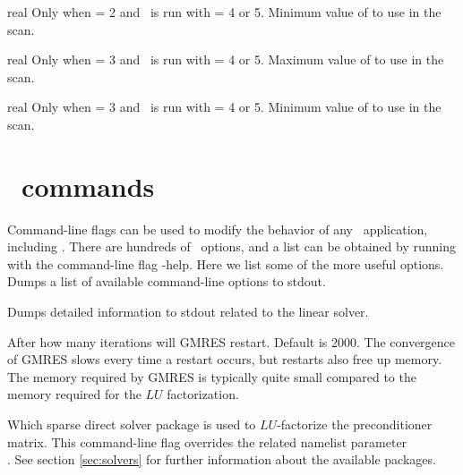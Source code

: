 \myhrule

{real}
{Only when  = 2 and \sfincsScan~is run with  = 4 or 5.}
{Minimum value of  to use in the scan.}

\myhrule

{real}
{Only when  = 3 and \sfincsScan~is run with  = 4 or 5.}
{Maximum value of  to use in the scan.}

\myhrule

{real}
{Only when  = 3 and \sfincsScan~is run with  = 4 or 5.}
{Minimum value of  to use in the scan.}


\section{\PETSc~commands}

Command-line flags can be used to modify the behavior of any \PETSc~application, including \sfincs.
There are hundreds of \PETSc~options, and a list can be obtained by running with the command-line flag
{\ttfamily -help}. Here we list some of the more useful options.\\

{Dumps a list of available command-line options to stdout.}

\myhrule

{Dumps detailed information to stdout related to the linear solver.}

\myhrule

{After how many iterations will GMRES restart. Default is 2000. The convergence of GMRES slows every time a restart occurs, but restarts also free up memory.
The memory required by GMRES is typically quite small compared to the memory required for the $LU$ factorization.}

\myhrule

{Which sparse direct solver package is used to $LU$-factorize the preconditioner matrix.
This command-line flag overrides the related namelist parameter\\
.
See section \ref{sec:solvers} for further information about the available packages.
}

